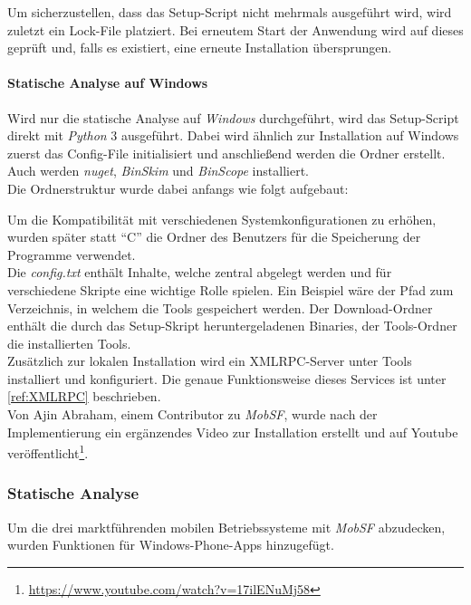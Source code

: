 Um sicherzustellen, dass das Setup-Script nicht mehrmals ausgeführt wird, wird zuletzt ein Lock-File platziert. Bei erneutem Start der Anwendung wird auf dieses geprüft und, falls es existiert, eine erneute Installation übersprungen.

\paragraph{Statische Analyse auf Windows}
Wird nur die statische Analyse auf \textit{Windows} durchgeführt, wird das Setup-Script direkt mit \textit{Python} 3 ausgeführt. Dabei wird ähnlich zur Installation auf Windows zuerst das Config-File initialisiert und anschließend werden die Ordner erstellt. Auch werden \textit{nuget}, \textit{BinSkim} und \textit{BinScope} installiert.\\

Die Ordnerstruktur wurde dabei anfangs wie folgt aufgebaut:


Um die Kompatibilität mit verschiedenen Systemkonfigurationen zu erhöhen, wurden später statt "`C"' die Ordner des Benutzers für die Speicherung der Programme verwendet.\\

Die \textit{config.txt} enthält Inhalte, welche zentral abgelegt werden und für verschiedene Skripte eine wichtige Rolle spielen. Ein Beispiel wäre der Pfad zum Verzeichnis, in welchem die Tools gespeichert werden. Der Download-Ordner enthält die durch das Setup-Skript heruntergeladenen Binaries, der Tools-Ordner die installierten Tools.\\

Zusätzlich zur lokalen Installation wird ein XMLRPC-Server unter Tools installiert und konfiguriert. Die genaue Funktionsweise dieses Services ist unter \ref{ref:XMLRPC} beschrieben.\\

Von Ajin Abraham, einem Contributor zu \textit{MobSF}, wurde nach der Implementierung ein ergänzendes Video zur Installation erstellt und auf Youtube veröffentlicht\footnote{\url{https://www.youtube.com/watch?v=17ilENuMj58}}.

\newpage
\subsubsection{Statische Analyse}
Um die drei marktführenden mobilen Betriebssysteme mit \textit{MobSF} abzudecken, wurden Funktionen für Windows-Phone-Apps hinzugefügt.\\


